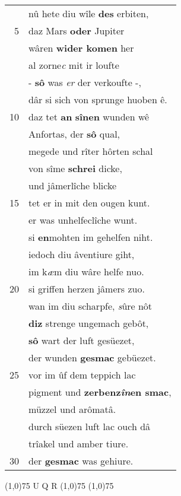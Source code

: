 \documentclass[8pt,a4paper,notitlepage]{article}
\begin{document}
\begin{table}[ht]
\begin{minipage}[t]{0.5\linewidth}
\begin{tabular}{rl}
 & nû hete diu wîle \textbf{des} erbiten,\\ 
5 & daz Mars \textbf{oder} Jupiter\\ 
 & wâren \textbf{wider komen} her\\ 
 & al zorne\textit{c} mit ir loufte\\ 
 & - \textbf{sô} was \textit{er} der verkoufte -,\\ 
 & dâr si sich von sprunge huoben ê.\\ 
10 & daz tet \textbf{an} \textbf{sînen} wunden wê\\ 
 & Anfortas, der \textbf{sô} qual,\\ 
 & megede und rîter hôrten schal\\ 
 & von sîme \textbf{schrei} dicke,\\ 
 & und jâmerlîche blicke\\ 
15 & tet er in mit den ougen kunt.\\ 
 & er was unhelfeclîche wunt.\\ 
 & si \textbf{en}mohten im gehelfen niht.\\ 
 & iedoch diu âventiure giht,\\ 
 & im k\textit{æ}m diu wâre helfe nuo.\\ 
20 & si griffen herzen jâmers zuo.\\ 
 & wan im diu scharpfe, \textit{s}ûre nôt\\ 
 & \textbf{diz} strenge ungemach gebôt,\\ 
 & \textbf{sô} wart der luft gesüezet,\\ 
 & der wunden \textbf{gesmac} gebüezet.\\ 
25 & vor im ûf dem teppich lac\\ 
 & pigment und \textbf{zerbenz\textit{în}en smac},\\ 
 & müzzel und arômatâ.\\ 
 & durch süezen luft lac ouch dâ\\ 
 & trîakel und amber tiure.\\ 
30 & der \textbf{gesmac} was gehiure.\\ 
\end{tabular}
\scriptsize
\line(1,0){75} \newline
U Q R \newline
\line(1,0){75} \newline
\newline
\line(1,0){75} \newline

\end{minipage}
\end{table}
\end{document}
